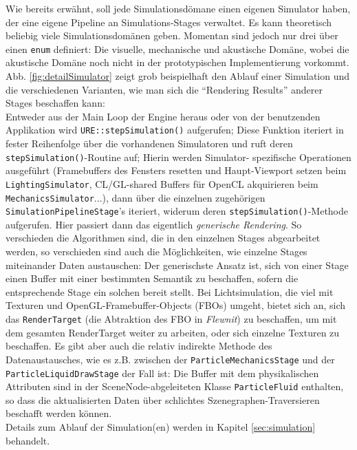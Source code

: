 	Wie bereits erwähnt, soll jede Simulationsdömane einen eigenen Simulator haben, 
	der eine eigene Pipeline an Simulations-Stages verwaltet.
	Es kann theoretisch beliebig viele Simulationsdomänen geben. Momentan sind jedoch nur drei
	über einen \lstinline|enum| definiert: Die visuelle, mechanische und akustische Domäne, wobei
	die akustische Domäne noch nicht in der prototypischen Implementierung vorkommt.
	Abb. \ref{fig:detailSimulator} zeigt grob beispielhaft den Ablauf einer Simulation und die verschiedenen
	Varianten, wie man sich die "`Rendering Results"' anderer Stages beschaffen kann:\\
	Entweder aus der Main Loop der Engine heraus oder von der benutzenden Applikation wird
	\lstinline|URE::stepSimulation()| aufgerufen; Diese Funktion iteriert in fester Reihenfolge über die
	vorhandenen Simulatoren und ruft deren \lstinline|stepSimulation()|-Routine auf; Hierin werden Simulator-
	spezifische Operationen ausgeführt (Framebuffers des Fensters resetten und Haupt-Viewport setzen beim 
	\lstinline|LightingSimulator|, CL/GL-shared Buffers für OpenCL akquirieren beim \lstinline|MechanicsSimulator|...),
	dann über die einzelnen zugehörigen \linebreak
	\lstinline|SimulationPipelineStage|'s iteriert, widerum deren 
	\lstinline|stepSimulation()|-Methode aufgerufen.
	Hier passiert dann das eigentlich \emph{generische Rendering}.
	So verschieden die Algorithmen sind, die in den einzelnen Stages abgearbeitet werden, so verschieden sind auch
	die Möglichkeiten, wie einzelne Stages miteinander Daten austauschen: Der generischste Ansatz ist, sich von einer
	Stage einen Buffer mit einer bestimmten Semantik zu beschaffen, sofern die entsprechende Stage ein solchen
	bereit stellt. Bei Lichtsimulation, die viel mit Texturen und OpenGL-Framebuffer-Objects (FBOs) umgeht,
	bietet sich an, sich das \lstinline|RenderTarget| (die Abtraktion des FBO in \emph{Flewnit}) zu beschaffen,
	um mit dem gesamten RenderTarget weiter zu arbeiten, oder sich einzelne Texturen zu beschaffen.
	Es gibt aber auch die relativ indirekte Methode des Datenaustausches, wie es z.B. zwischen der 
	\lstinline|ParticleMechanicsStage| und der \lstinline|ParticleLiquidDrawStage| der Fall ist: Die Buffer mit dem 		
	physikalischen Attributen sind in der SceneNode-abgeleiteten
	Klasse \lstinline|ParticleFluid| enthalten, so dass die aktualisierten Daten über schlichtes Szenegraphen-Traversieren
	beschafft werden können.\\
	Details zum Ablauf der Simulation(en) werden in Kapitel \ref{sec:simulation} behandelt.




